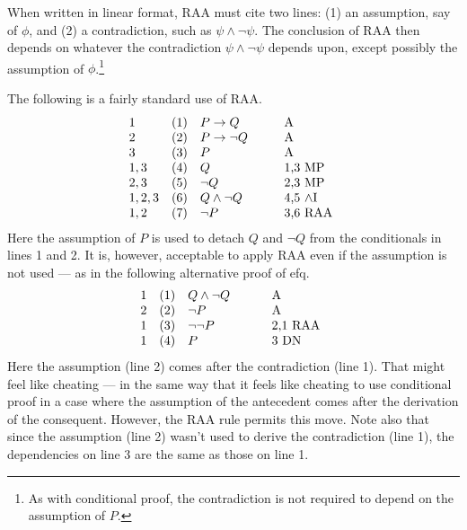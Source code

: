  When written in linear format, RAA must cite two lines: (1) an
 assumption, say of $\phi$, and (2) a contradiction, such as
 $\psi\wedge\neg \psi$.  The conclusion of RAA then depends on
 whatever the contradiction $\psi\wedge\neg \psi$ depends upon, except
 possibly the assumption of $\phi$.\footnote{As with conditional
   proof, the contradiction is not required to depend on the
   assumption of $P$.}

The following is a fairly standard use of RAA.
\[ \begin{array}{l l >{$}p{2cm}<{$} p{1.5cm}}
     1 & (1) & P\to Q & A \\
     2 & (2) & P\to \neg Q & A \\
     3 & (3) & P & A \\
     1,3 & (4) & Q & 1,3 MP \\
     2,3 & (5) & \neg Q & 2,3 MP \\
     1,2,3 & (6) & Q\wedge \neg Q & 4,5 $\wedge$I \\
     1,2 & (7) & \neg P & 3,6 RAA \end{array} \] %
 Here the assumption of $P$ is used to detach $Q$ and $\neg Q$ from
 the conditionals in lines 1 and 2.  It is, however, acceptable to
 apply RAA even if the assumption is not used --- as in the following
 alternative proof of \gls{efq}. %
 \[ \begin{array}{l l >{$}p{2cm}<{$} p{1.5cm}}
      1 & (1) & Q\wedge \neg Q & A \\
      2 & (2) & \neg P & A \\
      1 & (3) & \neg \neg P & 2,1 RAA \\
      1 & (4) & P & 3 DN \end{array} \] %
Here the assumption (line 2) comes after the contradiction (line 1).  That might feel like
cheating --- in the same way that it feels like cheating to use
conditional proof in a case where the assumption of the antecedent
comes after the derivation of the consequent.  However, the RAA rule
permits this move.  Note also that since the assumption (line 2)
wasn't used to derive the contradiction (line 1), the dependencies on
line 3 are the same as those on line 1.


